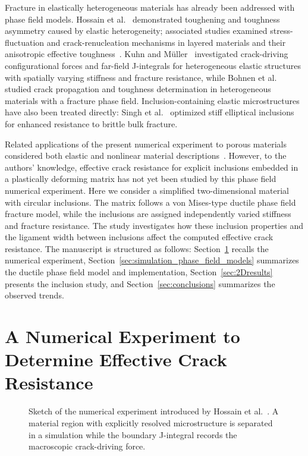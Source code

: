 \documentclass[pamm,a4paper,fleqn]{w-art}
\begin{document}
Fracture in elastically heterogeneous materials has already been
addressed with phase field models. Hossain et
al.~\cite{hossain_effective_2014} demonstrated toughening and
toughness asymmetry caused by elastic heterogeneity; associated
studies examined stress-fluctuation and crack-renucleation mechanisms
in layered materials and their anisotropic effective
toughness~\cite{hsueh_stress_2018,brach_anisotropy_2019}. Kuhn and
M\"uller~\cite{kuhn_discussion_2016} investigated crack-driving
configurational forces and far-field J-integrals for heterogeneous
elastic structures with spatially varying stiffness and fracture
resistance, while Bohnen et al.~\cite{bohnen_simulation_2024} studied
crack propagation and toughness determination in heterogeneous
materials with a fracture phase field. Inclusion-containing elastic
microstructures have also been treated directly: Singh et
al.~\cite{singh_optimization_2023} optimized stiff elliptical
inclusions for enhanced resistance to brittle bulk fracture.

Related applications of the present numerical experiment to porous
materials considered both elastic and nonlinear material
descriptions~\cite{schluter_determination_2025,%
  schluter_influence_2025}.
However, to the authors' knowledge, effective crack resistance for
explicit inclusions embedded in a plastically deforming matrix has
not yet been studied by this phase field numerical experiment. Here
we consider a simplified two-dimensional material with circular
inclusions. The matrix follows a von Mises-type
ductile phase field fracture model, while the inclusions are assigned
independently varied stiffness and fracture resistance. The study
investigates how these inclusion properties and the ligament width
between
inclusions affect the computed effective crack resistance. The
manuscript is structured as follows:
Section~\ref{sec:numericalExperiment}
recalls the numerical experiment,
Section~\ref{sec:simulation_phase_field_models} summarizes the
ductile phase field model and implementation,
Section~\ref{sec:2Dresults} presents the inclusion study, and
Section~\ref{sec:conclusions} summarizes the observed trends.

\section{A Numerical Experiment to Determine Effective Crack
  Resistance}\label{sec:numericalExperiment}

\begin{figure}[H]
  \centering
  \resizebox{0.6\textwidth}{!}{}
  \caption{Sketch of the numerical experiment introduced by Hossain
    et al.~\cite{hossain_effective_2014}. A material region with
    explicitly resolved microstructure is separated in a simulation
    while the boundary J-integral records the macroscopic
    crack-driving force.}
  \label{fig:numerical_experiment}
\end{figure}
\end{document}
